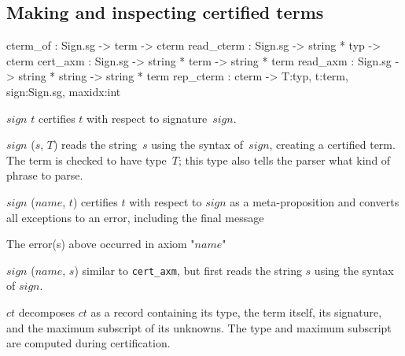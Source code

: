 \subsection{Making and inspecting certified terms}
\begin{ttbox}
cterm_of   : Sign.sg -> term -> cterm
read_cterm : Sign.sg -> string * typ -> cterm
cert_axm   : Sign.sg -> string * term -> string * term
read_axm   : Sign.sg -> string * string -> string * term
rep_cterm  : cterm -> {\ttlbrace}T:typ, t:term, sign:Sign.sg, maxidx:int\ttrbrace
\end{ttbox}
\begin{ttdescription}
\item[\ttindexbold{cterm_of} $sign$ $t$] 
certifies $t$ with respect to signature~$sign$.

\item[\ttindexbold{read_cterm} $sign$ ($s$, $T$)]
reads the string~$s$ using the syntax of~$sign$, creating a certified term.
The term is checked to have type~$T$; this type also tells the parser what
kind of phrase to parse.

\item[\ttindexbold{cert_axm} $sign$ ($name$, $t$)]
certifies $t$ with respect to $sign$ as a meta-proposition and converts all
exceptions to an error, including the final message
\begin{ttbox}
The error(s) above occurred in axiom "\(name\)"
\end{ttbox}

\item[\ttindexbold{read_axm} $sign$ ($name$, $s$)]
similar to {\tt cert_axm}, but first reads the string $s$ using the syntax of
$sign$.

\item[\ttindexbold{rep_cterm} $ct$]
decomposes $ct$ as a record containing its type, the term itself, its
signature, and the maximum subscript of its unknowns.  The type and maximum
subscript are computed during certification.
\end{ttdescription}


